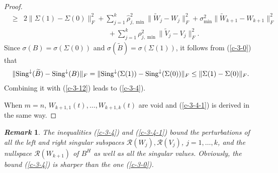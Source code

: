 \documentclass[11pt,a4paper]{article}
\numberwithin{equation}{section}
\newtheorem{Remark}{{\it Remark}}[section]
\newcommand {\wh} {\widehat}
\newcommand {\wt} {\widetilde}
\begin{document}
\begin{proof}
\begin{eqnarray}
&\ge&2\|\Sigma(1)-\Sigma(0)\|_F^2
+\sum_{j=1}^k\wh\rho_{j,\min}^2\|{\wt W_j-W_j}\|_F^2+
\sigma_{\min}^2\|{\wt W_{k+1}-W_{k+1}}\|_F^2\nonumber\\
&&\qquad\qquad\qquad\qquad\qquad\qquad
+ \sum_{j=1}^k\rho_{j,\min}^2\|{\wt V_j-V_j}\|_F^2.
\end{eqnarray}
Since $\sigma(B)=\sigma(\Sigma(0))$ and $\sigma(\wt B)=\sigma(\Sigma(1))$, it follows from (\ref{c-3-0}) that
\begin{eqnarray*}%
\|{\rm Sing}^{\downarrow}(\wt B)-{\rm Sing}^{\downarrow}(B)\|_F
=\|{\rm Sing}^{\downarrow}(\Sigma(1))-{\rm Sing}^{\downarrow}(\Sigma(0))\|_F
\leq \|\Sigma(1)-\Sigma(0)\|_F.
\end{eqnarray*}
Combining it with (\ref{c-3-12}) %
leads to (\ref{c-3-4}).

\medskip
When $m=n$, $W_{k+1,1}(t),\ldots,W_{k+1,k}(t)$ are void and (\ref{c-3-4-1}) is derived in the
same way.
\end{proof}

\medskip

\begin{Remark}\label{lem311}
The inequalities (\ref{c-3-4}) and (\ref{c-3-4-1}) bound the perturbations
of all the left and right singular subspaces $\mathcal R(W_j),\mathcal R(V_j)$,
$j=1,\ldots,k$, and the nullspace $\mathcal R(W_{k+1})$ of $B^H$ as well as
all the singular values.  Obviously, the bound (\ref{c-3-4}) is sharper than the one (\ref{c-3-0}).
\end{Remark}\vskip 2mm
\end{document}
